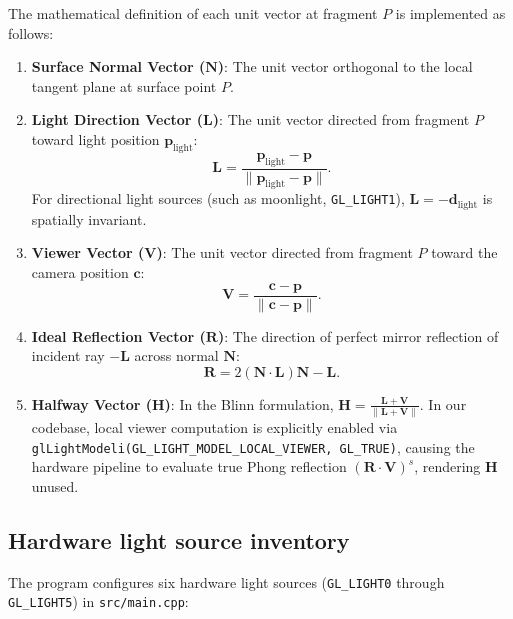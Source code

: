 \documentclass[10pt,a4paper,oneside]{article}
\begin{document}
The mathematical definition of each unit vector at fragment $P$ is implemented as follows:
\begin{enumerate}[leftmargin=1.5em]
\item \textbf{Surface Normal Vector ($\mathbf{N}$)}: The unit vector orthogonal to the local tangent plane at surface point $P$.
\item \textbf{Light Direction Vector ($\mathbf{L}$)}: The unit vector directed from fragment $P$ toward light position $\mathbf{p}_{\text{light}}$:
\begin{equation}
\mathbf{L} = \frac{\mathbf{p}_{\text{light}} - \mathbf{p}}{\|\mathbf{p}_{\text{light}} - \mathbf{p}\|}.
\end{equation}
For directional light sources (such as moonlight, \texttt{GL\_LIGHT1}), $\mathbf{L} = -\mathbf{d}_{\text{light}}$ is spatially invariant.
\item \textbf{Viewer Vector ($\mathbf{V}$)}: The unit vector directed from fragment $P$ toward the camera position $\mathbf{c}$:
\begin{equation}
\mathbf{V} = \frac{\mathbf{c} - \mathbf{p}}{\|\mathbf{c} - \mathbf{p}\|}.
\end{equation}
\item \textbf{Ideal Reflection Vector ($\mathbf{R}$)}: The direction of perfect mirror reflection of incident ray $-\mathbf{L}$ across normal $\mathbf{N}$:
\begin{equation}
\mathbf{R} = 2(\mathbf{N} \cdot \mathbf{L})\mathbf{N} - \mathbf{L}.
\end{equation}
\item \textbf{Halfway Vector ($\mathbf{H}$)}: In the Blinn formulation, $\mathbf{H} = \frac{\mathbf{L} + \mathbf{V}}{\|\mathbf{L} + \mathbf{V}\|}$. In our codebase, local viewer computation is explicitly enabled via \texttt{glLightModeli(GL\_LIGHT\_MODEL\_LOCAL\_VIEWER, GL\_TRUE)}, causing the hardware pipeline to evaluate true Phong reflection $(\mathbf{R} \cdot \mathbf{V})^s$, rendering $\mathbf{H}$ unused.
\end{enumerate}

\subsection{Hardware light source inventory}
The program configures six hardware light sources (\texttt{GL\_LIGHT0} through \texttt{GL\_LIGHT5}) in \texttt{src/main.cpp}:
\end{document}
